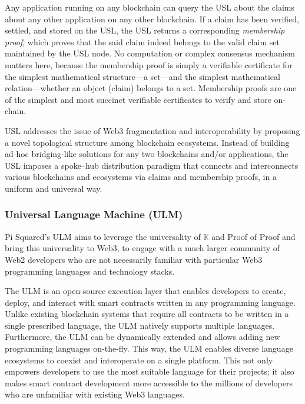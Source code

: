 \documentclass{article}
\newcommand{\K}{\ensuremath{\mathbb{K}}\xspace}
\newcommand{\ulm}{ULM}
\begin{document}
Any application running on any blockchain 
can query the USL about the claims 
about any other application on any other blockchain.
If a claim has been verified, settled, and stored on the USL, the USL returns a corresponding
\emph{membership proof}, which proves that the said claim indeed belongs to the valid claim set maintained by the USL node. 
No computation or complex consensus mechanism matters here, because the membership proof is simply a verifiable certificate for the simplest mathematical structure---a set---and the simplest mathematical relation---whether an object (claim) belongs to a set. 
Membership proofs are one of the simplest and most succinct verifiable certificates to verify and store on-chain. 

USL addresses the issue of Web3 fragmentation and interoperability by proposing a novel
topological structure among blockchain ecosystems.
Instead of building ad-hoc bridging-like solutions for any two blockchains and/or applications, 
the USL imposes a spoke–hub distribution paradigm that connects and interconnects various blockchains and ecosystems
via claims and membership proofs, in a uniform and universal way. 



\subsubsection{Universal Language Machine (ULM)} 

Pi Squared's ULM aims to leverage the universality of \K and Proof of Proof and bring this universality to Web3, to engage with a much larger community of Web2 developers who are not necessarily familiar with particular Web3 programming languages and technology stacks.

The ULM is an open-source execution layer that enables developers to create, deploy, and interact with smart contracts written in any programming language.
Unlike existing blockchain systems that require all contracts to be written in a single prescribed language, the ULM natively supports multiple languages.
Furthermore, the \ulm{} can be dynamically extended and allows adding new programming languages on-the-fly. 
This way, the ULM enables diverse language ecosystems to coexist and interoperate on a single platform.
This not only empowers developers to use the most suitable language for their projects; it also makes smart contract development more accessible to the millions of developers who are unfamiliar with existing Web3 languages.
\end{document}
